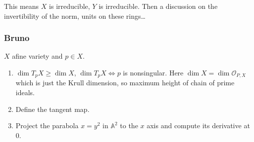 \begin{enumerate}[label=\textbf{Step \arabic*}]
This means $X$ is irreducible, $Y$ is irreducible. Then a discussion on the invertibility of the norm, units on these rings…
\end{enumerate}

 \subsubsection{Bruno}

\begin{manualexercise}{5.10}
$X$ afine variety and $p\in X$.
\begin{enumerate}[label=\alph*.]
	\item $\dim T_pX\geq \dim X$, $\dim T_pX\iff p$ is nonsingular. Here $\dim X=\dim \mathcal{O}_{P,X}$ which is just the Krull dimension, so maximum height of chain of prime ideals.
	\item Define the tangent map.

	\item Project the parabola $x=y^2$ in $\mathbb{A}^2$ to the  $x$ axis and compute its derivative at 0.
		\end{enumerate}
\end{manualexercise}

